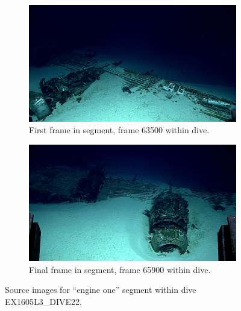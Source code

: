 \documentclass[letterpaper,12pt]{article}
\begin{document}
\begin{figure}
    \centering
    \begin{subfigure}[b]{0.48\textwidth}
        \includegraphics[width=\textwidth]{images/image_063500.png}
        \caption{First frame in segment, frame 63500 within dive.}
        \label{fig:ex1605l3_dive22_engine_one_begin}
    \end{subfigure}
    \begin{subfigure}[b]{0.48\textwidth}
        \includegraphics[width=\textwidth]{images/image_065900.png}
        \caption{Final frame in segment, frame 65900 within dive.}
        \label{fig:ex1605l3_dive22_engine_one_end}
    \end{subfigure}
    \caption{Source images for ``engine one'' segment within dive EX1605L3\_DIVE22.}
\end{figure}
\end{document}
